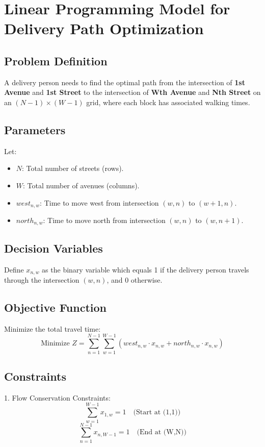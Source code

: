 \documentclass{article}
\begin{document}
\section*{Linear Programming Model for Delivery Path Optimization}

\subsection*{Problem Definition}
A delivery person needs to find the optimal path from the intersection of \textbf{1st Avenue} and \textbf{1st Street} to the intersection of \textbf{Wth Avenue} and \textbf{Nth Street} on an \((N-1) \times (W-1)\) grid, where each block has associated walking times.

\subsection*{Parameters}
Let:
\begin{itemize}
    \item \( N \): Total number of streets (rows).
    \item \( W \): Total number of avenues (columns).
    \item \( west_{n,w} \): Time to move west from intersection \((w,n)\) to \((w+1,n)\).
    \item \( north_{n,w} \): Time to move north from intersection \((w,n)\) to \((w,n+1)\).
\end{itemize}

\subsection*{Decision Variables}
Define \( x_{n,w} \) as the binary variable which equals 1 if the delivery person travels through the intersection \((w,n)\), and 0 otherwise.

\subsection*{Objective Function}
Minimize the total travel time:
\[
\text{Minimize } Z = \sum_{n=1}^{N-1} \sum_{w=1}^{W-1} \left( west_{n,w} \cdot x_{n,w} + north_{n,w} \cdot x_{n,w} \right)
\]

\subsection*{Constraints}
1. Flow Conservation Constraints:
    \[
    \sum_{w=1}^{W-1} x_{1,w} = 1 \quad \text{(Start at (1,1))}
    \]
    \[
    \sum_{n=1}^{N-1} x_{n,W-1} = 1 \quad \text{(End at (W,N))}
    \]
\end{document}
